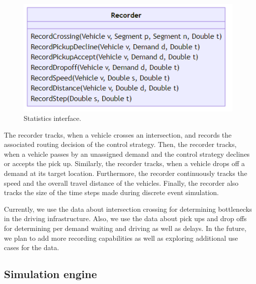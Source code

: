 \documentclass[10pt,twocolumn]{article}
\begin{document}
\begin{figure}[!ht]
    \centering
    \includegraphics[scale=0.4]{../../diagrams/statistics/classes-v2.png}
    \caption{Statistics interface.}
    \label{fig:statistics-interface}
\end{figure}

The recorder tracks, when a vehicle crosses an intersection, and records the associated routing decision of the control strategy.
Then, the recorder tracks, when a vehicle passes by an unassigned demand and the control strategy declines or accepts the pick up.
Similarly, the recorder tracks, when a vehicle drops off a demand at its target location.
Furthermore, the recorder continuously tracks the speed and the overall travel distance of the vehicles.
Finally, the recorder also tracks the size of the time steps made during discrete event simulation.

Currently, we use the data about intersection crossing for determining bottlenecks in the driving infrastructure.
Also, we use the data about pick ups and drop offs for determining per demand waiting and driving as well as delays.
In the future, we plan to add more recording capabilities as well as exploring additional use cases for the data.

\subsection{Simulation engine}
\label{sec:simulation-engine}
\end{document}

